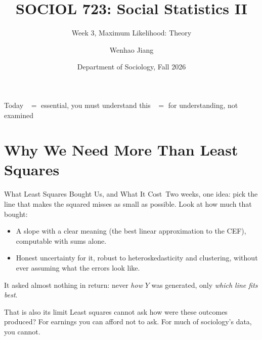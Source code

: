 \documentclass[aspectratio=169,11pt,xcolor=dvipsnames]{beamer}
\title[SOCIOL 723]{SOCIOL 723: Social Statistics II\\[-2pt]}
\subtitle{Week 3, Maximum Likelihood: Theory\\[-6pt]}
\author[Jiang]{Wenhao Jiang\vspace{-2.5em}}
\institute[Duke]{}
\date{Department of Sociology, Fall 2026}
\newcommand{\adv}{\,\raisebox{0.6pt}{\textcolor{accent}{$\bigstar$}}}
\newcommand{\core}{\,\raisebox{0.6pt}{\textcolor{corestar}{$\bigstar$}}}
\begin{document}
\begin{frame}[plain]
  \titlepage
\end{frame}

\begin{frame}{Today}
  \tableofcontents
  \vskip6pt
  {\footnotesize \core{} $=$ essential, you must understand this \quad\quad \adv{} $=$ for understanding, not examined}
\end{frame}

\section[Why Likelihood]{Why We Need More Than Least Squares}
\begin{frame}\sectionpage\end{frame}

\begin{frame}{What Least Squares Bought Us, and What It Cost\core}
Two weeks, one idea: pick the line that makes the squared misses as small as
possible. Look at how much that bought:
\begin{itemize}\itemsep3pt
  \item A slope with a clear meaning (the best linear approximation to the
        CEF), computable with sums alone.
  \item Honest uncertainty for it, robust to heteroskedasticity and
        clustering, without ever assuming what the errors look like.
\end{itemize}
\vskip2pt
It asked almost nothing in return: never \emph{how} $Y$ was generated,
only \emph{which line fits best}.
\vskip2pt
\begin{alertblock}{That is also its limit}
Least squares cannot ask \alert{how were these outcomes produced?} For
earnings you can afford not to ask. For much of sociology's data, you cannot.
\end{alertblock}
\end{frame}
\end{document}
